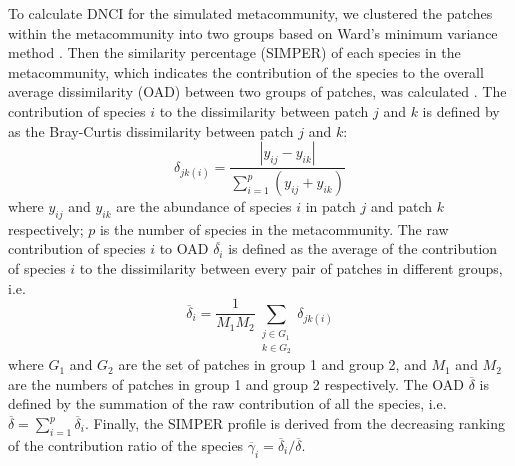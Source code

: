 	
	To calculate DNCI for the simulated metacommunity, we clustered the patches within the metacommunity into two groups based on Ward's minimum variance method \citep[pp360]{legendre2012numerical}. Then the similarity percentage (SIMPER) of each species in the metacommunity, which indicates the contribution of the species to the overall average dissimilarity (OAD) between two groups of patches, was calculated \citep{clarke1993non}. The contribution of species $i$ to the dissimilarity between patch $j$ and $k$ is defined by \citet{clarke1993non} as the Bray-Curtis dissimilarity between patch $j$ and $k$:
	\[
	\delta_{jk(i)} = \dfrac{|y_{ij} - y_{ik}|}{\sum_{i=1}^p (y_{ij}+y_{ik})}
	\]
	where $y_{ij}$ and $y_{ik}$ are the abundance of species $i$ in patch $j$ and patch $k$ respectively; $p$ is the number of species in the metacommunity. The raw contribution of species $i$ to OAD $\overline{\delta_i}$ is defined as the average of the contribution of species $i$ to the dissimilarity between every pair of patches in different groups, i.e.
	\[
	\overline{\delta}_i = \dfrac{1}{M_1M_2}\sum_{\substack{j \in G_1\\ k \in G_2}}\delta_{jk(i)}
	\]
	where $G_1$ and $G_2$ are the set of patches in group 1 and group 2, and $M_1$ and $M_2$ are the numbers of patches in group 1 and group 2 respectively. The OAD $\overline{\delta}$ is defined by the summation of the raw contribution of all the species, i.e. $\overline{\delta} = \sum_{i=1}^p \overline{\delta}_i$. Finally, the SIMPER profile is derived from the decreasing ranking of the contribution ratio of the species $\overline{\gamma}_i = \overline{\delta}_i/\overline{\delta}$.
	
